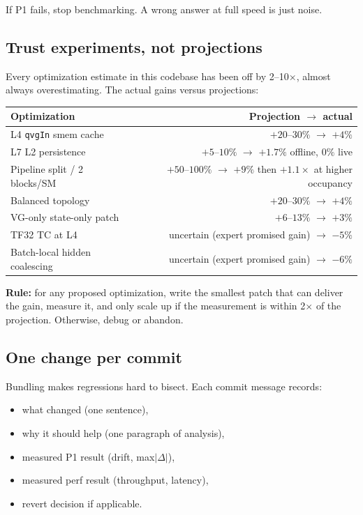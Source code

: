 \documentclass[11pt,a4paper]{article}
\begin{document}
If P1 fails, stop benchmarking. A wrong answer at full speed is just
noise.

\subsection{Trust experiments, not projections}

Every optimization estimate in this codebase has been off by
2--10$\times$, almost always overestimating. The actual gains versus
projections:

\begin{tabularx}{\linewidth}{lXr}
\toprule
\textbf{Optimization} & & \textbf{Projection $\to$ actual} \\
\midrule
L4 \texttt{qvgIn} smem cache    & & $+20$--$30\%$ $\to$ $+4\%$ \\
L7 L2 persistence               & & $+5$--$10\%$ $\to$ $+1.7\%$ offline, $0\%$ live \\
Pipeline split / 2 blocks/SM    & & $+50$--$100\%$ $\to$ $+9\%$ then $+1.1\times$ at higher occupancy \\
Balanced topology               & & $+20$--$30\%$ $\to$ $+4\%$ \\
VG-only state-only patch        & & $+6$--$13\%$ $\to$ $+3\%$ \\
TF32 TC at L4                   & & uncertain (expert promised gain) $\to$ $-5\%$ \\
Batch-local hidden coalescing   & & uncertain (expert promised gain) $\to$ $-6\%$ \\
\bottomrule
\end{tabularx}

\textbf{Rule:} for any proposed optimization, write the smallest patch
that can deliver the gain, measure it, and only scale up if the
measurement is within 2$\times$ of the projection. Otherwise, debug or
abandon.

\subsection{One change per commit}

Bundling makes regressions hard to bisect. Each commit message records:

\begin{itemize}[itemsep=0pt]
  \item what changed (one sentence),
  \item why it should help (one paragraph of analysis),
  \item measured P1 result (drift, max$|\Delta|$),
  \item measured perf result (throughput, latency),
  \item revert decision if applicable.
\end{itemize}
\end{document}

